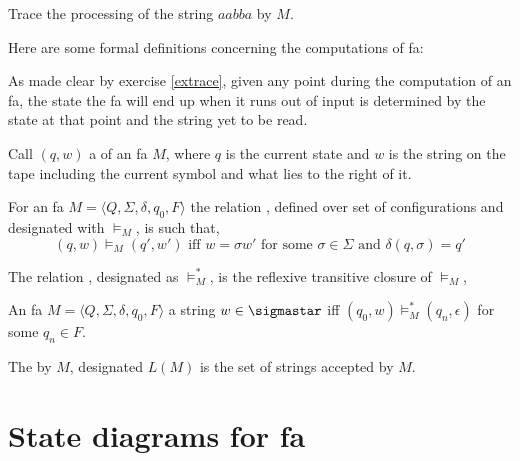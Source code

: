 \documentclass[11pt]{article}
\begin{document}
{\begin{uexercise}
Trace the processing of the string $aabba$ by $M$.
\end{uexercise}


\item Here are some formal definitions concerning the computations of fa:

\item[] As made clear by exercise \ref{extrace}, given any point during the
computation of an fa, the state the fa will end up when it runs out of input is
determined by the state at that point and the string yet to be read. 

\item[] Call $(q,w)$ a  of an fa $M$, where $q$ is the
current state and $w$ is the string on the tape including the current symbol and
what lies to the right of it.

\item[] For an fa $M=\langle Q,\Sigma,\delta,q_0,F\rangle$ the relation
, defined over set of configurations and designated
with $\models_M$, is such that, 
$$
(q,w)\models_M(q',w') \text{ iff } w = \sigma w' \text{ for some }
\sigma\in\Sigma \text{ and } \delta(q,\sigma) = q'
$$

\item[] The relation , designated as $\models_M^*$, is the reflexive transitive closure of $\models_M$, 

\item[] An fa $M=\langle Q,\Sigma,\delta,q_0,F\rangle$  
	a string $w\in\sigmastar$ iff $(q_0,w)\models_M^*(q_n,\epsilon)$ for some $q_n\in F$.  

\item The  by $M$, designated $L(M)$ is the set of
strings accepted by $M$.

}
\section{State diagrams for fa}
\end{document}
